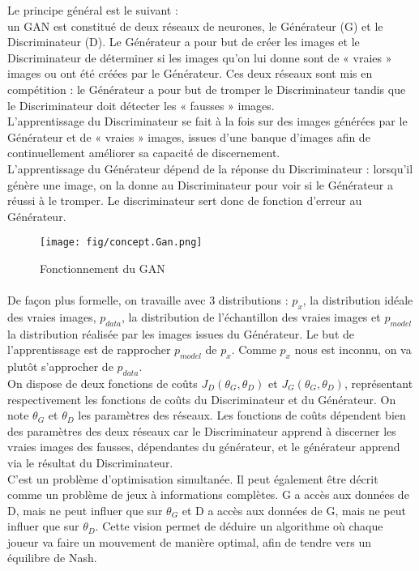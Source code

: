 		Le principe général est le suivant : \\ un GAN est constitué de deux réseaux de neurones, le Générateur (G) et le Discriminateur (D). Le Générateur a pour but de créer les images et le Discriminateur de déterminer si les images qu’on lui donne sont de « vraies » images ou ont été créées par le Générateur. Ces deux réseaux sont mis en compétition : le Générateur a pour but de tromper le Discriminateur tandis que le Discriminateur doit détecter les « fausses » images.\\
		L’apprentissage du Discriminateur se fait à la fois sur des images générées par le Générateur et de « vraies » images, issues d’une banque d’images afin de continuellement améliorer sa capacité de discernement.\\
		L’apprentissage du Générateur dépend de la réponse du  Discriminateur : lorsqu’il génère une image, on la donne au Discriminateur pour voir si le Générateur a réussi à le tromper. Le discriminateur sert donc de fonction d'erreur au Générateur.
	
\begin{figure}[h]
  \centerline{\texttt{[image: fig/concept.Gan.png]}}
  \caption{Fonctionnement du GAN}
  \label{fig:concept_gan}
\end{figure}

	\paragraph{}
		De façon plus formelle, on travaille avec 3 distributions : $p_x$, la distribution idéale des vraies images, $p_{data}$, la distribution de l'échantillon des vraies images et $p_{model}$ la distribution réalisée par les images issues du Générateur. Le but de l’apprentissage est de rapprocher $p_{model}$ de $p_x$. Comme $p_x$ nous est inconnu, on va plutôt s'approcher de $p_{data}$.\\
		On dispose de deux fonctions de coûts $J_D(\theta_G, \theta_D)$ et $J_G(\theta_G, \theta_D)$, représentant respectivement les fonctions de coûts du Discriminateur et du Générateur. On note $\theta_G$ et $\theta_D$ les paramètres des réseaux. Les fonctions de coûts dépendent bien des paramètres des deux réseaux car le Discriminateur apprend à discerner les vraies images des fausses, dépendantes du générateur, et le générateur apprend via le résultat du Discriminateur.\\ C'est un problème d'optimisation simultanée. 
		Il peut également être décrit comme un problème de jeux à informations complètes. G a accès aux données de D, mais ne peut influer que sur $\theta_G$ et D a accès aux données de G, mais ne peut influer que sur $\theta_D$. Cette vision permet de déduire un algorithme où chaque joueur va faire un mouvement de manière optimal, afin de tendre vers un équilibre de Nash.

